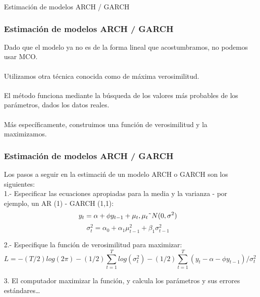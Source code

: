 \documentclass[xcolor=(list of options)]{beamer}
\begin{document}
\begin{section}{Estimaci\'on de modelos ARCH / GARCH}
\begin{frame}
\frametitle{Estimaci\'on de modelos ARCH / GARCH}

Dado que el modelo ya no es de la forma lineal que acostumbramos, no podemos usar MCO.\\
\\
Utilizamos otra t\'ecnica conocida como de m\'axima verosimilitud.\\
\\
El m\'etodo funciona mediante la b\'usqueda de los valores m\'as probables de los par\'ametros, dados los datos reales.\\
\\
M\'as específicamente, construimos una funci\'on de verosimilitud y la maximizamos. 


\end{frame}

\begin{frame}
\frametitle{Estimaci\'on de modelos ARCH / GARCH}

Los pasos a seguir en la estimaci\'n de un modelo ARCH o GARCH son los siguientes:\\
1.- Especificar las ecuaciones apropiadas para la media y la varianza - por ejemplo, un AR (1) - GARCH (1,1):\\

\begin{equation}
y_{t}=\alpha+\phi y_{t-1}+\mu_t, \mu_t \string~N(0,\sigma^2)
\end{equation}
\begin{equation}
\sigma_{t}^{2}=\alpha_{0}+\alpha_{1}\mu_{t-1}^{2}+\beta_{1}\sigma_{t-1}^{2}
\end{equation}

2.- Especifique la función de verosimilitud para maximizar:\\

\begin{equation}
L = - (T/2)log(2 \pi) - (1/2) \sum_{t=1}^{T} log(\sigma_{t}^{2}) - (1/2) \sum_{t=1}^{T} (y_t - \alpha-\phi y_{t-1})/\sigma_{t}^{2}
\end{equation}

3. El computador maximizar la funci\'on, y calcula los par\'ametros y sus errores est\'andares…\\


\end{frame}
\end{section}
\end{document}
